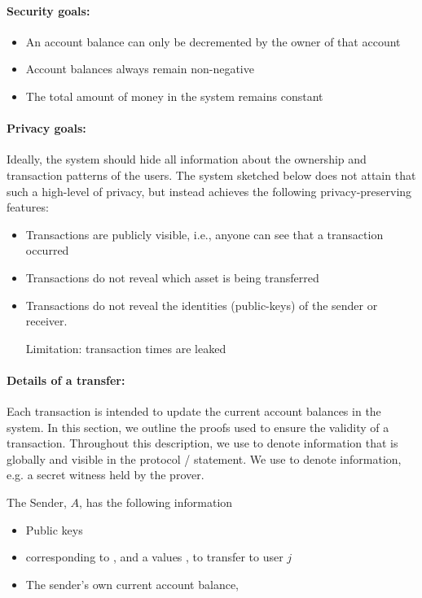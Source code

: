 \paragraph{Security goals:}
    \begin{itemize}
		\item An account balance can only be decremented by the owner of that account
    \item Account balances always remain non-negative
    \item The total amount of money in the system remains constant
		\end{itemize}


\paragraph{Privacy goals:}
Ideally, the system should hide all information about the ownership and transaction patterns of the users.
The system sketched below does not attain that such a high-level of privacy, but instead achieves the following privacy-preserving features:
    \begin{itemize}
		\item Transactions are publicly visible, i.e., anyone can see that a transaction occurred
    \item Transactions do not reveal which asset is being transferred
    \item Transactions do not reveal the identities (public-keys) of the sender or receiver.

		Limitation: transaction times are leaked
		\end{itemize}



\paragraph{Details of a transfer:}

Each transaction is intended to update the current account balances in the system.  In this section, we outline the proofs used to ensure the validity of a transaction.  Throughout this description, we use  to denote information that is globally and  visible in the protocol / statement.  We use  to denote  information, e.g. a secret witness held by the prover.

The Sender, $A$, has the following information
	\begin{itemize}
    \item Public keys 
    \item {} corresponding to , and a values , to transfer to user $j$
    \item The sender’s own current account balance, 
	\end{itemize}

